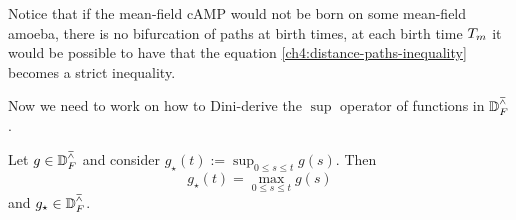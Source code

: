 \begin{remark}
	Notice that if the mean-field cAMP would not be born on some mean-field amoeba, \ie there is no bifurcation of paths at birth times, at each birth time $T_m$ it would be possible to have that the equation \ref{ch4:distance-paths-inequality} becomes a strict inequality.
\end{remark}

Now we need to work on how to Dini-derive the $\sup$ operator of functions in $\mathbb{D}_F^\barwedge$.

\begin{lemma}
Let $g \in \mathbb{D}_F^\barwedge$ and consider $g_\star (t) := \sup_{0\leq s \leq t} g(s)$.
Then
\begin{equation}
g_\star (t) = \max_{0\leq s \leq t} g(s)
\end{equation}
and $g_\star \in \mathbb{D}_F^\barwedge$.
\end{lemma}

